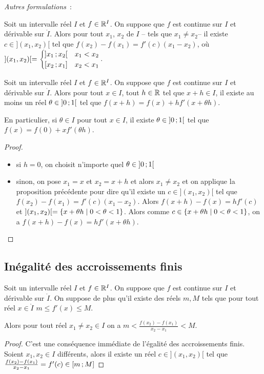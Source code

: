 \emph{Autres formulations}~:

\begin{prop}
  Soit un intervalle réel \(I\) et \(f \in \mathbb{R}^I\). On suppose que \(f\) est 
  continue sur \(I\) et dérivable sur \(\mathring{I}\). Alors pour tout \(x_1\), 
  \(x_2\) de \(I\) -- tels que \(x_1 \neq x_2\)-- il existe \(c \in 
  ](x_1,x_2)[\) tel que \(f(x_2)-f(x_1)=f'(c)(x_1-x_2)\), où \( ](x_1,x_2)[ = 
  \begin{cases} \left] x_1 \, ; {} x_2 \right[ & x_1 < x_2 \\ \left[ x_2 \, ; {} x_1 \right] & 
  x_2 < x_1 \end{cases}\).
\end{prop}
\begin{prop}
  Soit un intervalle réel \(I\) et \(f \in \mathbb{R}^I\). On suppose que \(f\) est 
  continue sur \(I\) et dérivable sur \(\mathring{I}\). Alors pour tout \(x \in 
  I\), tout \(h \in \mathbb{R}\) tel que \(x+h \in I\), il existe au moins un réel 
  \(\theta \in \left] 0 \, ; {} 1 \right[\) tel que \(f(x+h)=f(x)+hf'(x+\theta h)\). 

  En particulier, si \(\theta \in I\) pour tout \(x \in I\), il existe \(\theta 
  \in \left] 0 \, ; {} 1 \right[\) tel que \(f(x)=f(0)+xf'(\theta h)\).
\end{prop}
\begin{proof}
  \begin{itemize}
    \item si \(h=0\), on choisit n'importe quel \(\theta \in 
      \left] 0 \, ; {} 1 \right[\)
    \item sinon, on pose \(x_1=x\) et \(x_2=x+h\) et alors \(x_1 \neq x_2\) et 
      on applique la proposition précédente pour dire qu'il existe un \(c \in 
      ](x_1,x_2)[\) tel que \(f(x_2)-f(x_1)=f'(c)(x_1-x_2)\). Alors 
      \(f(x+h)-f(x)=hf'(c)\) et \(](x_1,x_2)[ = \left\{x+\theta h\mathrel{}\middle|\mathrel{}0 < \theta < 
      1\right\}\). Alors comme \(c \in \left\{x+\theta h\mathrel{}\middle|\mathrel{}0 < \theta < 1\right\}\), on a 
      \(f(x+h)-f(x)=hf'(x + \theta h)\).
  \end{itemize}
\end{proof}

\subsection{Inégalité des accroissements finis}

\begin{theo}[IAF]\label{theo:iaf}
  Soit un intervalle réel \(I\) et \(f \in \mathbb{R}^I\). On suppose que \(f\) est 
  continue sur \(I\) et dérivable sur \(\mathring{I}\). On suppose de plus qu'il 
  existe des réels \(m,M\) tels que pour tout réel \(x \in \mathring{I}\) \(m 
  \leqslant f'(x) \leqslant M\).

  Alors pour tout réel \(x_1 \neq x_2 \in I\) on a \(m < 
  \frac{f(x_2)-f(x_1)}{x_2-x_1} < M\).
\end{theo}
\begin{proof}
  C'est une conséquence immédiate de l'égalité des accroissements finis. Soient 
  \(x_1, x_2 \in I\) différents, alors il existe un réel \(c \in ](x_1,x_2)[\) 
  tel que \(\frac{f(x_2)-f(x_1)}{x_2-x_1} = f'(c) \in \left[ m \, ; {} M \right]\)
\end{proof}

